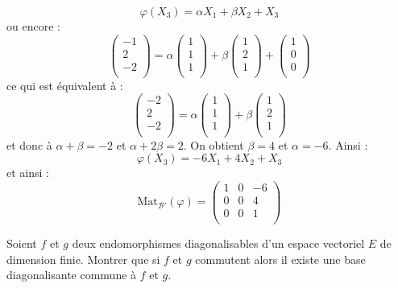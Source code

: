 \documentclass[a4paper,10pt]{report}
\begin{document}
\begin{enumerate}
$$ \varphi(X_3) = \alpha X_1 + \beta X_2 + X_3$$
ou encore :
$$ \begin{pmatrix}
-1 \\
2 \\
-2 \\
\end{pmatrix} = \alpha \begin{pmatrix}
1 \\
1 \\
1 \\
\end{pmatrix} + \beta \begin{pmatrix}
1 \\
2 \\
1 \\
\end{pmatrix} + \begin{pmatrix}
1 \\
0\\
0\\
\end{pmatrix}$$
ce qui est équivalent à :
$$  \begin{pmatrix}
-2 \\
2 \\
-2 \\
\end{pmatrix} = \alpha \begin{pmatrix}
1 \\
1 \\
1 \\
\end{pmatrix} + \beta \begin{pmatrix}
1 \\
2 \\
1 \\
\end{pmatrix} $$
et donc à $\alpha+ \beta =-2$ et $\alpha+2 \beta = 2$. On obtient $\beta =4$ et $\alpha = -6$. Ainsi :
$$ \varphi(X_3) = -6 X_1 + 4 X_2 + X_3$$
et ainsi :
$$ \textrm{Mat}_{\mathcal{B}'}(\varphi) = \begin{pmatrix}
1 & 0 & -6 \\
0 & 0 & 4 \\
0 & 0 & 1 \\
\end{pmatrix}$$
\end{enumerate}

\begin{Exa}  Soient $f$ et $g$ deux endomorphismes diagonalisables d'un espace vectoriel $E$ de dimension finie. Montrer que si $f$ et $g$ commutent alors il existe une base diagonalisante commune à $f$ et $g$.
\end{Exa}
\end{document}
